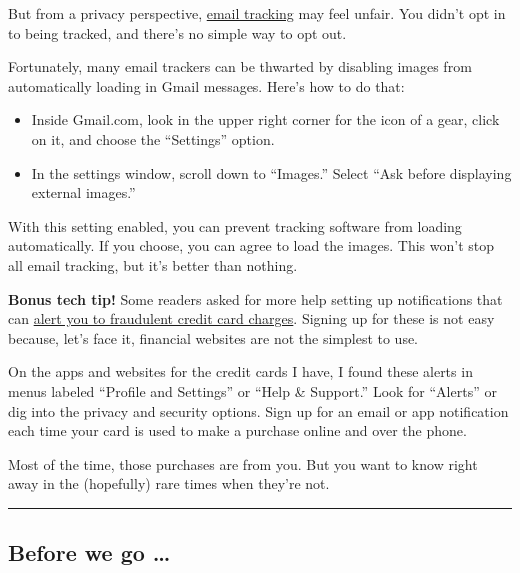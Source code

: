 But from a privacy perspective,
\href{https://www.getrevue.co/profile/themarkup/issues/hello-from-the-markup-199187}{email
tracking} may feel unfair. You didn't opt in to being tracked, and
there's no simple way to opt out.

Fortunately, many email trackers can be thwarted by disabling images
from automatically loading in Gmail messages. Here's how to do that:

\begin{itemize}
\item
  Inside Gmail.com, look in the upper right corner for the icon of a
  gear, click on it, and choose the ``Settings'' option.
\item
  In the settings window, scroll down to ``Images.'' Select ``Ask before
  displaying external images.''
\end{itemize}

With this setting enabled, you can prevent tracking software from
loading automatically. If you choose, you can agree to load the images.
This won't stop all email tracking, but it's better than nothing.

\textbf{Bonus tech tip!} Some readers asked for more help setting up
notifications that can
\href{https://www.nytimes3xbfgragh.onion/2020/06/08/technology/how-to-reduce-credit-card-fraud.html}{alert
you to fraudulent credit card charges}. Signing up for these is not easy
because, let's face it, financial websites are not the simplest to use.

On the apps and websites for the credit cards I have, I found these
alerts in menus labeled ``Profile and Settings'' or ``Help \& Support.''
Look for ``Alerts'' or dig into the privacy and security options. Sign
up for an email or app notification each time your card is used to make
a purchase online and over the phone.

Most of the time, those purchases are from you. But you want to know
right away in the (hopefully) rare times when they're not.

\begin{center}\rule{0.5\linewidth}{\linethickness}\end{center}

\hypertarget{before-we-go-}{%
\subsection{Before we go \ldots{}}\label{before-we-go-}}

